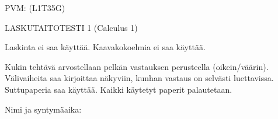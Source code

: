 \documentclass[finnish, a4paper, 12pt]{article}
\begin{document}
	
	
		PVM: \underline{\phantom{mm.mm.}}
		\hfill
		(L1T35G)	%
	
	\begin{center}
		{\large
			LASKUTAITOTESTI 1 (Calculus 1)}
	\end{center}
	
	Laskinta ei saa käyttää. Kaavakokoelmia ei saa käyttää.
	
	Kukin tehtävä arvostellaan pelkän vastauksen perusteella (oikein/väärin).
	Välivaiheita saa kirjoittaa näkyviin, kunhan vastaus on selvästi luettavissa.
	Suttupaperia saa käyttää. Kaikki käytetyt paperit palautetaan.
	
\vspace{12pt}
Nimi ja syntymäaika: \phantom{m} \hrulefill
\vspace{8pt}
	
\end{document}
